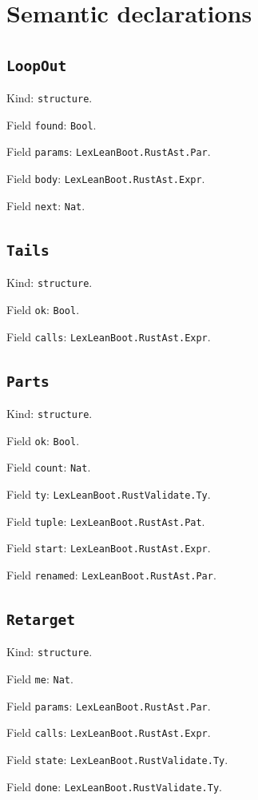 \documentclass[11pt]{article}
\begin{document}
\section*{Semantic declarations}
\subsection*{\texttt{LoopOut}}
\noindent Kind: \texttt{structure}.\par
\noindent Field \texttt{found}: \texttt{Bool}.\par
\noindent Field \texttt{params}: \texttt{LexLeanBoot.RustAst.Par}.\par
\noindent Field \texttt{body}: \texttt{LexLeanBoot.RustAst.Expr}.\par
\noindent Field \texttt{next}: \texttt{Nat}.\par
\subsection*{\texttt{Tails}}
\noindent Kind: \texttt{structure}.\par
\noindent Field \texttt{ok}: \texttt{Bool}.\par
\noindent Field \texttt{calls}: \texttt{LexLeanBoot.RustAst.Expr}.\par
\subsection*{\texttt{Parts}}
\noindent Kind: \texttt{structure}.\par
\noindent Field \texttt{ok}: \texttt{Bool}.\par
\noindent Field \texttt{count}: \texttt{Nat}.\par
\noindent Field \texttt{ty}: \texttt{LexLeanBoot.RustValidate.Ty}.\par
\noindent Field \texttt{tuple}: \texttt{LexLeanBoot.RustAst.Pat}.\par
\noindent Field \texttt{start}: \texttt{LexLeanBoot.RustAst.Expr}.\par
\noindent Field \texttt{renamed}: \texttt{LexLeanBoot.RustAst.Par}.\par
\subsection*{\texttt{Retarget}}
\noindent Kind: \texttt{structure}.\par
\noindent Field \texttt{me}: \texttt{Nat}.\par
\noindent Field \texttt{params}: \texttt{LexLeanBoot.RustAst.Par}.\par
\noindent Field \texttt{calls}: \texttt{LexLeanBoot.RustAst.Expr}.\par
\noindent Field \texttt{state}: \texttt{LexLeanBoot.RustValidate.Ty}.\par
\noindent Field \texttt{done}: \texttt{LexLeanBoot.RustValidate.Ty}.\par
\end{document}
